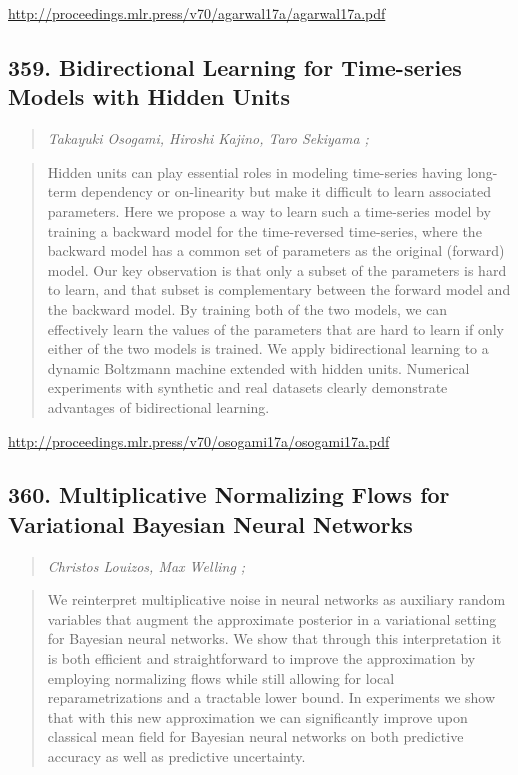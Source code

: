 \documentclass{article}
\begin{document}
\href{http://proceedings.mlr.press/v70/agarwal17a/agarwal17a.pdf}{http://proceedings.mlr.press/v70/agarwal17a/agarwal17a.pdf}

\subsection{359. Bidirectional Learning for Time-series Models with Hidden Units}

\begin{quote}
\footnotesize{\textit{Takayuki Osogami, Hiroshi Kajino, Taro Sekiyama ;}}

\end{quote}

\begin{quote}
    Hidden units can play essential roles in modeling time-series having long-term dependency or on-linearity but make it difficult to learn associated parameters. Here we propose a way to learn such a time-series model by training a backward model for the time-reversed time-series, where the backward model has a common set of parameters as the original (forward) model. Our key observation is that only a subset of the parameters is hard to learn, and that subset is complementary between the forward model and the backward model. By training both of the two models, we can effectively learn the values of the parameters that are hard to learn if only either of the two models is trained. We apply bidirectional learning to a dynamic Boltzmann machine extended with hidden units. Numerical experiments with synthetic and real datasets clearly demonstrate advantages of bidirectional learning.  
\end{quote}

\href{http://proceedings.mlr.press/v70/osogami17a/osogami17a.pdf}{http://proceedings.mlr.press/v70/osogami17a/osogami17a.pdf}

\subsection{360. Multiplicative Normalizing Flows for Variational Bayesian Neural Networks}

\begin{quote}
\footnotesize{\textit{Christos Louizos, Max Welling ;}}

\end{quote}

\begin{quote}
    We reinterpret multiplicative noise in neural networks as auxiliary random variables that augment the approximate posterior in a variational setting for Bayesian neural networks. We show that through this interpretation it is both efficient and straightforward to improve the approximation by employing normalizing flows while still allowing for local reparametrizations and a tractable lower bound. In experiments we show that with this new approximation we can significantly improve upon classical mean field for Bayesian neural networks on both predictive accuracy as well as predictive uncertainty.  
\end{quote}
\end{document}
